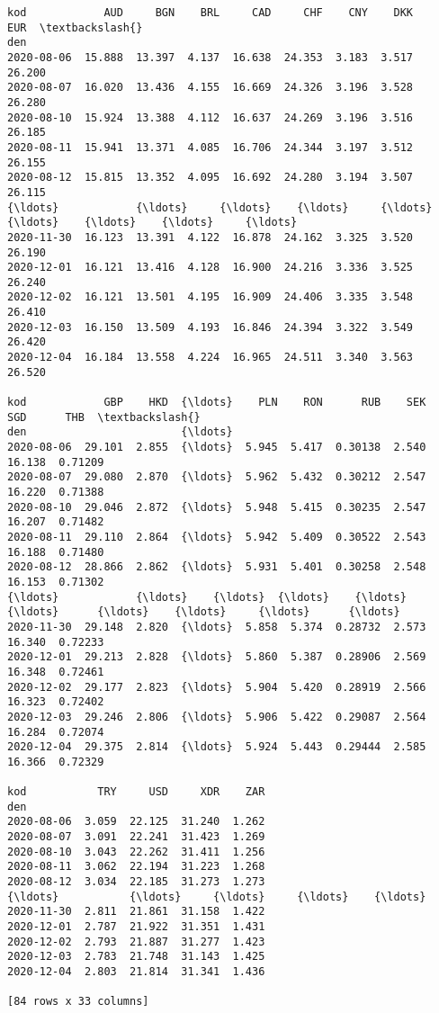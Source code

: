 \documentclass[11pt]{article}
\makeatletter
\newcommand{\boxspacing}{\kern\kvtcb@left@rule\kern\kvtcb@boxsep}
\newcommand{\prompt}[4]{
        {\ttfamily\llap{{\color{#2}[#3]:\hspace{3pt}#4}}\vspace{-\baselineskip}}
    }
\makeatother
\begin{document}
            \begin{tcolorbox}[breakable, size=fbox, boxrule=.5pt, pad at break*=1mm, opacityfill=0]
\prompt{Out}{outcolor}{11}{\boxspacing}
\begin{Verbatim}[commandchars=\\\{\}]
kod            AUD     BGN    BRL     CAD     CHF    CNY    DKK     EUR  \textbackslash{}
den
2020-08-06  15.888  13.397  4.137  16.638  24.353  3.183  3.517  26.200
2020-08-07  16.020  13.436  4.155  16.669  24.326  3.196  3.528  26.280
2020-08-10  15.924  13.388  4.112  16.637  24.269  3.196  3.516  26.185
2020-08-11  15.941  13.371  4.085  16.706  24.344  3.197  3.512  26.155
2020-08-12  15.815  13.352  4.095  16.692  24.280  3.194  3.507  26.115
{\ldots}            {\ldots}     {\ldots}    {\ldots}     {\ldots}     {\ldots}    {\ldots}    {\ldots}     {\ldots}
2020-11-30  16.123  13.391  4.122  16.878  24.162  3.325  3.520  26.190
2020-12-01  16.121  13.416  4.128  16.900  24.216  3.336  3.525  26.240
2020-12-02  16.121  13.501  4.195  16.909  24.406  3.335  3.548  26.410
2020-12-03  16.150  13.509  4.193  16.846  24.394  3.322  3.549  26.420
2020-12-04  16.184  13.558  4.224  16.965  24.511  3.340  3.563  26.520

kod            GBP    HKD  {\ldots}    PLN    RON      RUB    SEK     SGD      THB  \textbackslash{}
den                        {\ldots}
2020-08-06  29.101  2.855  {\ldots}  5.945  5.417  0.30138  2.540  16.138  0.71209
2020-08-07  29.080  2.870  {\ldots}  5.962  5.432  0.30212  2.547  16.220  0.71388
2020-08-10  29.046  2.872  {\ldots}  5.948  5.415  0.30235  2.547  16.207  0.71482
2020-08-11  29.110  2.864  {\ldots}  5.942  5.409  0.30522  2.543  16.188  0.71480
2020-08-12  28.866  2.862  {\ldots}  5.931  5.401  0.30258  2.548  16.153  0.71302
{\ldots}            {\ldots}    {\ldots}  {\ldots}    {\ldots}    {\ldots}      {\ldots}    {\ldots}     {\ldots}      {\ldots}
2020-11-30  29.148  2.820  {\ldots}  5.858  5.374  0.28732  2.573  16.340  0.72233
2020-12-01  29.213  2.828  {\ldots}  5.860  5.387  0.28906  2.569  16.348  0.72461
2020-12-02  29.177  2.823  {\ldots}  5.904  5.420  0.28919  2.566  16.323  0.72402
2020-12-03  29.246  2.806  {\ldots}  5.906  5.422  0.29087  2.564  16.284  0.72074
2020-12-04  29.375  2.814  {\ldots}  5.924  5.443  0.29444  2.585  16.366  0.72329

kod           TRY     USD     XDR    ZAR
den
2020-08-06  3.059  22.125  31.240  1.262
2020-08-07  3.091  22.241  31.423  1.269
2020-08-10  3.043  22.262  31.411  1.256
2020-08-11  3.062  22.194  31.223  1.268
2020-08-12  3.034  22.185  31.273  1.273
{\ldots}           {\ldots}     {\ldots}     {\ldots}    {\ldots}
2020-11-30  2.811  21.861  31.158  1.422
2020-12-01  2.787  21.922  31.351  1.431
2020-12-02  2.793  21.887  31.277  1.423
2020-12-03  2.783  21.748  31.143  1.425
2020-12-04  2.803  21.814  31.341  1.436

[84 rows x 33 columns]
\end{Verbatim}
\end{tcolorbox}
        
\end{document}
